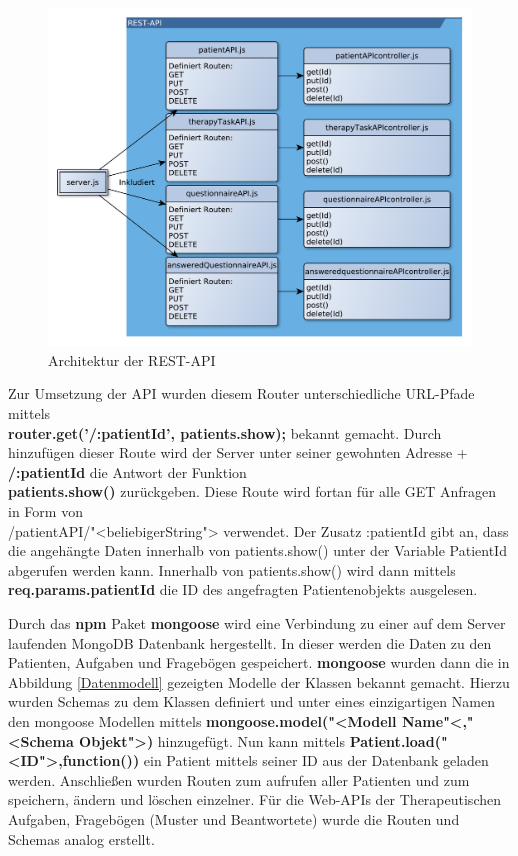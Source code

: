 \begin{figure}[H]
	\centering
	\includegraphics[scale=0.64]{images/RESTAPI_Architektur}
	\caption[Architektur der REST-API]{Architektur der REST-API}
	\label{REST Architektur}
\end{figure}
Zur Umsetzung der API wurden diesem Router unterschiedliche URL-Pfade mittels \\ \textbf{router.get('/:patientId', patients.show);} bekannt gemacht. Durch hinzufügen dieser Route wird der Server unter seiner gewohnten Adresse + \textbf{/:patientId} die Antwort der Funktion \\ \textbf{patients.show()} zurückgeben. Diese Route wird fortan für alle GET Anfragen in Form von \\ /patientAPI/"<beliebigerString"> verwendet. Der Zusatz :patientId gibt an, dass die angehängte Daten innerhalb von patients.show() unter der Variable PatientId abgerufen werden kann. Innerhalb von patients.show() wird dann mittels \textbf{req.params.patientId} die ID des angefragten Patientenobjekts ausgelesen.

Durch das \textbf{npm} Paket \textbf{mongoose} wird eine Verbindung zu einer auf dem Server laufenden MongoDB Datenbank hergestellt. In dieser werden die Daten zu den Patienten, Aufgaben und Fragebögen gespeichert. \textbf{mongoose} wurden dann die in Abbildung \ref{Datenmodell} gezeigten Modelle der Klassen bekannt gemacht. Hierzu wurden Schemas zu dem Klassen definiert und unter eines einzigartigen Namen den mongoose Modellen mittels \textbf{mongoose.model("<Modell Name"<,"<Schema Objekt">)} hinzugefügt. Nun kann mittels \textbf{Patient.load("<ID">,function())} ein Patient mittels seiner ID aus der Datenbank geladen werden. Anschließen wurden Routen zum aufrufen aller Patienten und zum speichern, ändern und löschen einzelner. Für die Web-APIs der Therapeutischen Aufgaben, Fragebögen (Muster und Beantwortete) wurde die Routen und Schemas analog erstellt.

